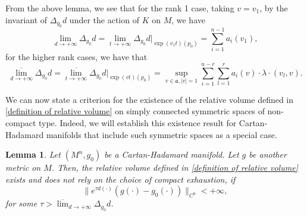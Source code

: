 \documentclass[12pt]{amsart}
\newtheorem{lemma}{Lemma}[section]
\begin{document}
From the above lemma, we see that for the rank 1 case, taking $v = v_1$, by the invariant of $\Delta_{g_0} d$ under the action of $K$ on $M$, we have 
\begin{equation}
    \lim_{d\rightarrow+\infty} \Delta_{g_0} d = \lim_{t \rightarrow + \infty} \Delta_{g_0} d|_{\exp(v_1 t)(p_0)} = \sum_{i = 1}^{n - 1} a_i(v_1),
\end{equation}
for the higher rank cases, we have that 
\begin{equation}
    \overline{\lim_{d\rightarrow +\infty}} \Delta_{g_0} d =  \overline{\lim_{t\rightarrow +\infty}} \Delta_{g_0} d|_{\exp(v t)(p_0)} = \sup_{v\in\mathfrak{a}, |v| = 1} \sum_{i = 1}^{n - r} \sum_{l = 1}^{r} a_i(v) \cdot \lambda \cdot (v_l, v).
\end{equation}

We can now state a criterion for the existence of the relative volume defined in \eqref{definition of relative volume} on simply connected symmetric spaces of non-compact type. Indeed, we will establish this existence result for Cartan-Hadamard manifolds that include such symmetric spaces as a special case.
\begin{lemma}\label{existence of relative volume}
    Let $(M^n, g_0)$ be a Cartan-Hadamard manifold. Let $g$ be another metric on $M$. Then, the relative volume defined in \eqref{definition of relative volume} exists and does not rely on the choice of compact exhaustion, if 
    \begin{equation}
        \|e^{\tau d(\cdot)}(g(\cdot) - g_0(\cdot))\|_{C^0} < +\infty,
    \end{equation}
    for some $\displaystyle \tau > \overline{\lim}_{d\rightarrow+\infty} \Delta_{g_0} d$.
\end{lemma}
\end{document}
